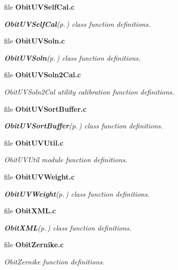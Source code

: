 \begin{CompactItemize}
\item 
file {\bf Obit\-UVSelf\-Cal.c}
\begin{CompactList}\small\item\em {\bf Obit\-UVSelf\-Cal}{\rm (p.\,\pageref{structObitUVSelfCal})} class function definitions. \item\end{CompactList}

\item 
file {\bf Obit\-UVSoln.c}
\begin{CompactList}\small\item\em {\bf Obit\-UVSoln}{\rm (p.\,\pageref{structObitUVSoln})} class function definitions. \item\end{CompactList}

\item 
file {\bf Obit\-UVSoln2Cal.c}
\begin{CompactList}\small\item\em Obit\-UVSoln2Cal utility calibration function definitions. \item\end{CompactList}

\item 
file {\bf Obit\-UVSort\-Buffer.c}
\begin{CompactList}\small\item\em {\bf Obit\-UVSort\-Buffer}{\rm (p.\,\pageref{structObitUVSortBuffer})} class function definitions. \item\end{CompactList}

\item 
file {\bf Obit\-UVUtil.c}
\begin{CompactList}\small\item\em Obit\-UVUtil module function definitions. \item\end{CompactList}

\item 
file {\bf Obit\-UVWeight.c}
\begin{CompactList}\small\item\em {\bf Obit\-UVWeight}{\rm (p.\,\pageref{structObitUVWeight})} class function definitions. \item\end{CompactList}

\item 
file {\bf Obit\-XML.c}
\begin{CompactList}\small\item\em {\bf Obit\-XML}{\rm (p.\,\pageref{structObitXML})} class function definitions. \item\end{CompactList}

\item 
file {\bf Obit\-Zernike.c}
\begin{CompactList}\small\item\em Obit\-Zernike function definitions. \item\end{CompactList}

\end{CompactItemize}
